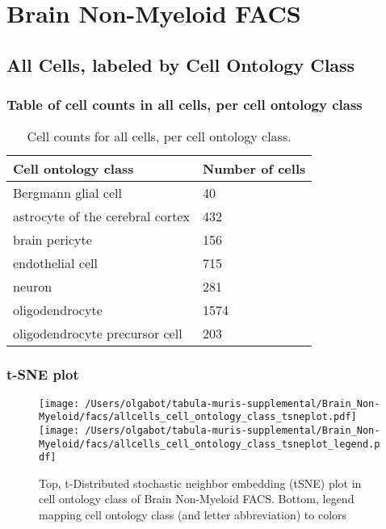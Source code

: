 \newpage
\section{Brain Non-Myeloid FACS}

\subsection{All Cells, labeled by Cell Ontology Class}
\subsubsection{Table of cell counts in all cells, per cell ontology class}\begin{table}[h]
\centering
\label{my-label}
\begin{tabular}{@{}ll@{}}
\toprule

Cell ontology class& Number of cells \\ \midrule
Bergmann glial cell & 40 \\

astrocyte of the cerebral cortex & 432 \\

brain pericyte & 156 \\

endothelial cell & 715 \\

neuron & 281 \\

oligodendrocyte & 1574 \\

oligodendrocyte precursor cell & 203 \\
\bottomrule
\end{tabular}
\caption{Cell counts for all cells, per cell ontology class.}
\end{table}

\newpage
\subsubsection{t-SNE plot}
\begin{figure}[h]
\centering
\texttt{[image: /Users/olgabot/tabula-muris-supplemental/Brain\_Non-Myeloid/facs/allcells\_cell\_ontology\_class\_tsneplot.pdf]}
\texttt{[image: /Users/olgabot/tabula-muris-supplemental/Brain\_Non-Myeloid/facs/allcells\_cell\_ontology\_class\_tsneplot\_legend.pdf]}
\caption{Top, t-Distributed stochastic neighbor embedding (tSNE) plot  in cell ontology class of Brain Non-Myeloid FACS. Bottom, legend mapping cell ontology class (and letter abbreviation) to colors}
\end{figure}


